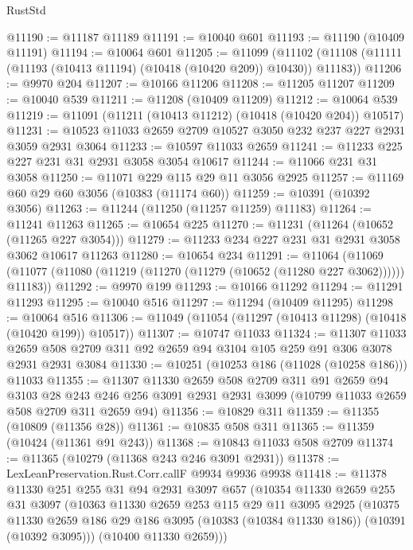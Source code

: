 \begin{lexlean}{RustStd}
\begin{coremodule}
@11190 := @11187 @11189
@11191 := @10040 @601
@11193 := @11190 (@10409 @11191)
@11194 := @10064 @601
@11205 := @11099
    (@11102 (@11108 (@11111 (@11193 (@10413 @11194) (@10418 (@10420 @209)) @10430)) @11183))
@11206 := @9970 @204
@11207 := @10166 @11206
@11208 := @11205 @11207
@11209 := @10040 @539
@11211 := @11208 (@10409 @11209)
@11212 := @10064 @539
@11219 := @11091 (@11211 (@10413 @11212) (@10418 (@10420 @204)) @10517)
@11231 := @10523 @11033 @2659 @2709 @10527 @3050 @232 @237 @227 @2931 @3059 @2931 @3064
@11233 := @10597 @11033 @2659
@11241 := @11233 @225 @227 @231 @31 @2931 @3058 @3054 @10617
@11244 := @11066 @231 @31 @3058
@11250 := @11071 @229 @115 @29 @11 @3056 @2925
@11257 := @11169 @60 @29 @60 @3056 (@10383 (@11174 @60))
@11259 := @10391 (@10392 @3056)
@11263 := @11244 (@11250 (@11257 @11259) @11183)
@11264 := @11241 @11263
@11265 := @10654 @225
@11270 := @11231 (@11264 (@10652 (@11265 @227 @3054)))
@11279 := @11233 @234 @227 @231 @31 @2931 @3058 @3062 @10617 @11263
@11280 := @10654 @234
@11291 := @11064
    (@11069 (@11077 (@11080 (@11219 (@11270 (@11279 (@10652 (@11280 @227 @3062)))))) @11183))
@11292 := @9970 @199
@11293 := @10166 @11292
@11294 := @11291 @11293
@11295 := @10040 @516
@11297 := @11294 (@10409 @11295)
@11298 := @10064 @516
@11306 := @11049 (@11054 (@11297 (@10413 @11298) (@10418 (@10420 @199)) @10517))
@11307 := @10747 @11033
@11324 := @11307
    @11033
    @2659
    @508
    @2709
    @311
    @92
    @2659
    @94
    @3104
    @105
    @259
    @91
    @306
    @3078
    @2931
    @2931
    @3084
@11330 := @10251 (@10253 @186 (@11028 (@10258 @186))) @11033
@11355 := @11307
    @11330
    @2659
    @508
    @2709
    @311
    @91
    @2659
    @94
    @3103
    @28
    @243
    @246
    @256
    @3091
    @2931
    @2931
    @3099
    (@10799 @11033 @2659 @508 @2709 @311 @2659 @94)
@11356 := @10829 @311
@11359 := @11355 (@10809 (@11356 @28))
@11361 := @10835 @508 @311
@11365 := @11359 (@10424 (@11361 @91 @243))
@11368 := @10843 @11033 @508 @2709
@11374 := @11365 (@10279 (@11368 @243 @246 @3091 @2931))
@11378 := LexLeanPreservation.Rust.Corr.callF @9934 @9936 @9938
@11418 := @11378
    @11330
    @251
    @255
    @31
    @94
    @2931
    @3097
    @657
    (@10354
      @11330
      @2659
      @255
      @31
      @3097
      (@10363
        @11330
        @2659
        @253
        @115
        @29
        @11
        @3095
        @2925
        (@10375
          @11330
          @2659
          @186
          @29
          @186
          @3095
          (@10383 (@10384 @11330 @186))
          (@10391 (@10392 @3095)))
        (@10400 @11330 @2659)))

\end{coremodule}
\end{lexlean}
